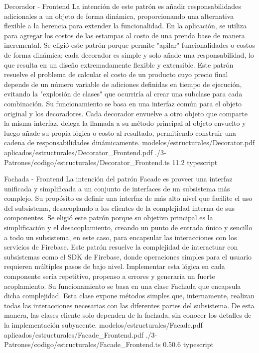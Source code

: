 \Patron
    {Decorador - Frontend}
    {La intención de este patrón es añadir responsabilidades adicionales a un objeto de forma dinámica, proporcionando una alternativa flexible a la herencia para extender la funcionalidad. En la aplicación, se utiliza para agregar los costos de las estampas al costo de una prenda base de manera incremental. Se eligió este patrón porque permite "apilar" funcionalidades o costos de forma dinámica; cada decorador es simple y solo añade una responsabilidad, lo que resulta en un diseño extremadamente flexible y extensible.}
    {Este patrón resuelve el problema de calcular el costo de un producto cuyo precio final depende de un número variable de adiciones definidas en tiempo de ejecución, evitando la "explosión de clases" que ocurriría al crear una subclase para cada combinación. Su funcionamiento se basa en una interfaz común para el objeto original y los decoradores. Cada decorador envuelve a otro objeto que comparte la misma interfaz, delega la llamada a su método principal al objeto envuelto y luego añade su propia lógica o costo al resultado, permitiendo construir una cadena de responsabilidades dinámicamente.}
    {modelos/estructurales/Decorator.pdf}
    {aplicados/estructurales/Decorator_Frontend.pdf}
    {./3-Patrones/codigo/estructurales/Decorator_Frontend.ts}
    {1}{1.2}
    {typescript}
\newpage

\Patron
    {Fachada - Frontend}
    {La intención del patrón Facade es proveer una interfaz unificada y simplificada a un conjunto de interfaces de un subsistema más complejo. Su propósito es definir una interfaz de más alto nivel que facilite el uso del subsistema, desacoplando a los clientes de la complejidad interna de sus componentes. Se eligió este patrón porque su objetivo principal es la simplificación y el desacoplamiento, creando un punto de entrada único y sencillo a todo un subsistema, en este caso, para encapsular las interacciones con los servicios de Firebase.}
    {Este patrón resuelve la complejidad de interactuar con subsistemas como el SDK de Firebase, donde operaciones simples para el usuario requieren múltiples pasos de bajo nivel. Implementar esta lógica en cada componente sería repetitivo, propenso a errores y generaría un fuerte acoplamiento. Su funcionamiento se basa en una clase Fachada que encapsula dicha complejidad. Esta clase expone métodos simples que, internamente, realizan todas las interacciones necesarias con las diferentes partes del subsistema. De esta manera, las clases cliente solo dependen de la fachada, sin conocer los detalles de la implementación subyacente.}
    {modelos/estructurales/Facade.pdf}
    {aplicados/estructurales/Facade_Frontend.pdf}
    {./3-Patrones/codigo/estructurales/Facade_Frontend.ts}
    {0.5}{0.6}
    {typescript}
\newpage

